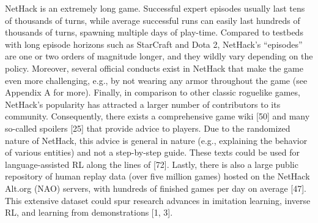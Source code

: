 NetHack is an extremely long game. Successful expert episodes usually last tens of thousands of
turns, while average successful runs can easily last hundreds of thousands of turns, spawning multiple
days of play-time. Compared to testbeds with long episode horizons such as StarCraft and Dota 2,
NetHack’s “episodes” are one or two orders of magnitude longer, and they wildly vary depending
on the policy. Moreover, several official conducts exist in NetHack that make the game even more
challenging, e.g., by not wearing any armor throughout the game (see Appendix A for more).
Finally, in comparison to other classic roguelike games, NetHack’s popularity has attracted a larger
number of contributors to its community. Consequently, there exists a comprehensive game wiki [50]
and many so-called spoilers [25] that provide advice to players. Due to the randomized nature of
NetHack, this advice is general in nature (e.g., explaining the behavior of various entities) and not
a step-by-step guide. These texts could be used for language-assisted RL along the lines of [72].
Lastly, there is also a large public repository of human replay data (over five million games) hosted
on the NetHack Alt.org (NAO) servers, with hundreds of finished games per day on average [47].
This extensive dataset could spur research advances in imitation learning, inverse RL, and learning
from demonstrations [1, 3].

